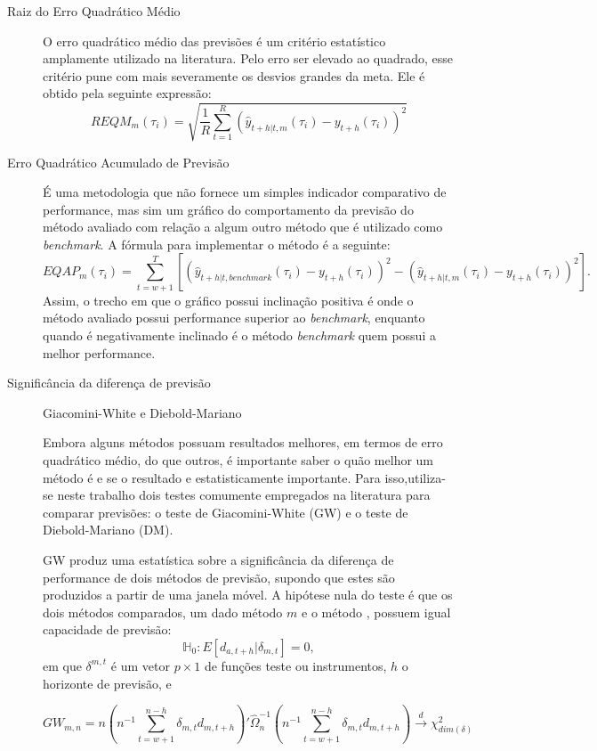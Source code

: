 \documentclass[
	12pt,				%
	openright,			%
	oneside,			%
	a4paper,			%
	english,			%
	brazil				%
	]{dissertacao-ufrgs-abntex2}
\begin{document}
\begin{description}
	\item[Raiz do Erro Quadrático Médio] O erro quadrático médio das previsões é um critério estatístico amplamente utilizado na literatura. Pelo erro ser elevado ao quadrado, esse critério pune com mais severamente os desvios grandes da meta. Ele é obtido pela seguinte expressão: \[ REQM_m(\tau_i) = \sqrt{ \frac{1}{R} \sum _{t = 1}^R (\hat{y}_{t+h|t,m}(\tau_i) - y_{t+h}(\tau_i))^2 } \]
	\item[Erro Quadrático Acumulado de Previsão] É uma metodologia que não fornece um simples indicador comparativo de performance, mas sim um gráfico do comportamento da previsão do método avaliado com relação a algum outro método que é utilizado como \emph{benchmark}. A fórmula para implementar o método é a seguinte:
	\[ EQAP_{m}(\tau_i) = \sum_{t=w+1}^T  \left[ \left( \hat{y}_{t+h|t,benchmark}(\tau_i) - y_{t+h}(\tau_i) \right)^2 - \left( \hat{y}_{t+h|t,m}(\tau_i) - y_{t+h}(\tau_i) \right)^2 \right]. \]
Assim, o trecho em que o gráfico possui inclinação positiva é onde o método avaliado possui performance superior ao \emph{benchmark}, enquanto quando é negativamente inclinado é o método \emph{benchmark} quem possui a melhor performance.
	
	\item[Significância da diferença de previsão]
	
	Giacomini-White e Diebold-Mariano

Embora alguns métodos possuam resultados melhores, em termos de erro quadrático médio, do que outros, é importante saber o quão melhor um método é e se o resultado e estatisticamente importante. 
Para isso,utiliza-se neste trabalho dois testes comumente empregados na literatura para comparar previsões: o teste de 
Giacomini-White (GW) e o teste de Diebold-Mariano (DM).

GW produz uma estatística sobre a significância da diferença de performance de dois métodos de previsão, supondo que estes são 
produzidos a partir de uma janela móvel. A hipótese nula do teste é que os dois métodos comparados, um dado método $m$ e o método \bm, possuem igual capacidade de previsão:
\begin{equation}
\mathbb{H}_0:E[d_{a,t+h}|\delta_{m,t}]=0,
\end{equation}
em que $\delta^{m,t}$ é um vetor $p \times 1$ de funções teste ou instrumentos, $h$ o horizonte de previsão, e 

	
\begin{equation}
GW_{m,n} = n \left( n^{-1} \sum_{t=w+1}^{n-h} \delta_{m,t} d_{m,t+h} \right)' \hat{\Omega}_n^{-1}	
\left( n^{-1} \sum_{t=w+1}^{n-h} \delta_{m,t} d_{m,t+h} \right) \overset{d}{\longrightarrow} \chi_{dim(\delta)}^2
\end{equation}		
	
	
\end{description}
\end{document}
